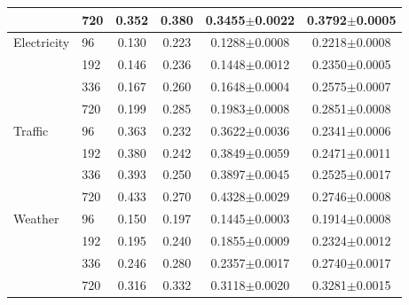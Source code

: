 {\begin{table}[t]
{\begin{tabular}{llcccc}
 & 720 & 0.352 & 0.380 & 0.3455{\scriptsize$\pm$0.0022} & 0.3792{\scriptsize$\pm$0.0005} \\
\midrule
Electricity & 96 & 0.130 & 0.223 & 0.1288{\scriptsize$\pm$0.0008} & 0.2218{\scriptsize$\pm$0.0008} \\
 & 192 & 0.146 & 0.236 & 0.1448{\scriptsize$\pm$0.0012} & 0.2350{\scriptsize$\pm$0.0005} \\
 & 336 & 0.167 & 0.260 & 0.1648{\scriptsize$\pm$0.0004} & 0.2575{\scriptsize$\pm$0.0007} \\
 & 720 & 0.199 & 0.285 & 0.1983{\scriptsize$\pm$0.0008} & 0.2851{\scriptsize$\pm$0.0008} \\
\midrule
Traffic & 96 & 0.363 & 0.232 & 0.3622{\scriptsize$\pm$0.0036} & 0.2341{\scriptsize$\pm$0.0006} \\
 & 192 & 0.380 & 0.242 & 0.3849{\scriptsize$\pm$0.0059} & 0.2471{\scriptsize$\pm$0.0011} \\
 & 336 & 0.393 & 0.250 & 0.3897{\scriptsize$\pm$0.0045} & 0.2525{\scriptsize$\pm$0.0017} \\
 & 720 & 0.433 & 0.270 & 0.4328{\scriptsize$\pm$0.0029} & 0.2746{\scriptsize$\pm$0.0008} \\
\midrule
Weather & 96 & 0.150 & 0.197 & 0.1445{\scriptsize$\pm$0.0003} & 0.1914{\scriptsize$\pm$0.0008} \\
 & 192 & 0.195 & 0.240 & 0.1855{\scriptsize$\pm$0.0009} & 0.2324{\scriptsize$\pm$0.0012} \\
 & 336 & 0.246 & 0.280 & 0.2357{\scriptsize$\pm$0.0017} & 0.2740{\scriptsize$\pm$0.0017} \\
 & 720 & 0.316 & 0.332 & 0.3118{\scriptsize$\pm$0.0020} & 0.3281{\scriptsize$\pm$0.0015} \\
\bottomrule
\end{tabular}
}
\end{table}

}
